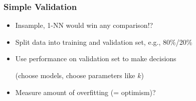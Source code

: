 \documentclass[
    utf8,
    aspectratio=169
]{beamer}  %
\begin{document}
\begin{frame}
	\frametitle{Simple Validation}
	\begin{itemize}
		\item Insample, 1-NN would win any comparison!?
		\item Split data into training and validation set, e.g., 80\%/20\%
		\item Use performance on validation set to make decisions 
		
		(choose models, choose parameters like $k$)
		\item Measure amount of overfitting (= optimism)?
	\end{itemize}

	\vfill
	
	\begin{example}
	\end{example}
\end{frame}
\end{document}
